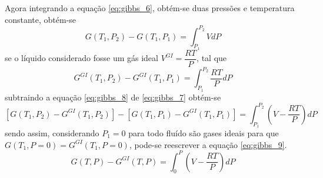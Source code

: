 Agora integrando a equação \ref{eq:gibbs_6}, obtém-se duas pressões e temperatura constante, obtém-se
\begin{equation}\label{eq:gibbs_7}
G(T_1,P_2)-G(T_1,P_1)=\int_{P_1}^{P_2}VdP
\end{equation}
se o líquido considerado fosse um gás ideal $V^{GI}=\dfrac{RT}{P}$, tal que
\begin{equation}\label{eq:gibbs_8}
G^{GI}(T_1,P_2)-G^{GI}(T_1,P_1)=\int_{P_1}^{P_2}\dfrac{RT}{P}dP
\end{equation}
subtraindo a equação \ref{eq:gibbs_8} de \ref{eq:gibbs_7} obtém-se
\begin{equation}\label{eq:gibbs_9}
[G(T_1,P_2)-G^{GI}(T_1,P_2)]-[G(T_1,P_1)-G^{GI}(T_1,P_1)]=\int_{P_1}^{P_2}\left(V-\dfrac{RT}{P}\right)dP
\end{equation}
sendo assim, considerando $P_1=0$ para todo fluído são gases ideais para que $G(T_1,P=0)=G^{GI}(T_1,P=0)$, pode-se reescrever a equação \ref{eq:gibbs_9}.
\begin{equation}\label{eq:gibbs_10}
G(T,P)-G^{GI}(T,P)=\int_{0}^{P}\left(V-\dfrac{RT}{P}\right)dP
\end{equation}
\cite{Sandlel}

